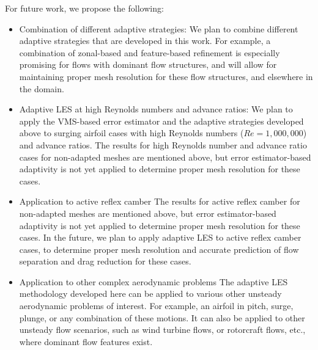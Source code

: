 For future work, we propose the following:

\begin{itemize}
	\item Combination of different adaptive strategies:
	We plan to combine different adaptive strategies that are developed in this work. For example, a combination of zonal-based and feature-based refinement is especially promising for flows with dominant flow structures, and will allow for maintaining proper mesh resolution for these flow structures, and elsewhere in the domain.
	
	\item Adaptive LES at high Reynolds numbers and advance ratios:
	We plan to apply the VMS-based error estimator and the adaptive strategies developed above to
	surging airfoil cases with high Reynolds numbers ($Re=1,000,000$) and advance ratios. The results for high Reynolds number and advance ratio cases for non-adapted meshes are mentioned above, but error estimator-based adaptivity is not yet applied to determine proper mesh resolution for these cases.
	
	\item Application to active reflex camber
	The results for active reflex camber for non-adapted meshes are mentioned above, but error estimator-based	adaptivity is not yet applied to determine proper mesh resolution for these cases. In the future, we plan to apply adaptive LES to active reflex camber cases, to determine proper mesh resolution and accurate prediction of flow separation and drag reduction for these cases.
	
	\item Application to other complex aerodynamic problems
	The adaptive LES methodology developed here can be applied to various other unsteady aerodynamic problems of interest. For example, an airfoil in pitch, surge, plunge, or any combination of these motions.
	It can also be applied to other unsteady flow scenarios, such as wind turbine flows, or rotorcraft flows, etc., where dominant flow features exist. 
	
	
	
\end{itemize}